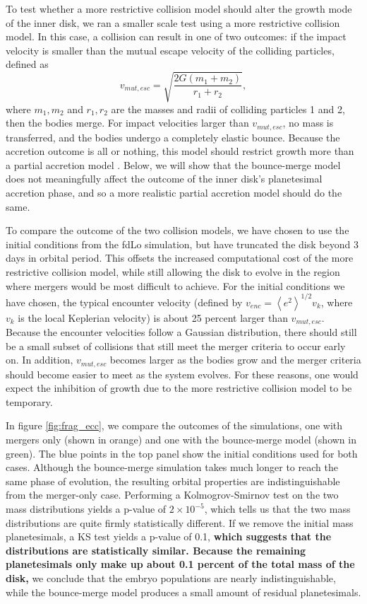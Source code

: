 \documentclass[twocolumn,linenumbers]{aastex63}
\begin{document}
To test whether a more restrictive collision model should alter the growth mode of the inner disk, we ran a smaller scale test 
using a more restrictive collision model. In this case, a collision can result in one of two outcomes: if the impact velocity is 
smaller than the mutual escape velocity of the colliding particles, defined as
\begin{equation}\label{eq:v_mut}
	v_{mut, esc} = \sqrt{\frac{2 G (m_{1} + m_{2})}{r_{1} + r_{2}}},
\end{equation}
where $m_{1}, m_{2}$ and $r_{1}, r_{2}$ are the masses and radii of
colliding particles 1 and 2, then the bodies merge. For
impact velocities larger than $v_{mut, esc}$, no mass is transferred, and the bodies undergo a completely elastic bounce. 
Because the accretion outcome is all or nothing, this model should restrict growth more than a partial accretion model 
\citep{leinhardt12}. Below, we will show that the bounce-merge model does not meaningfully affect the outcome of the inner 
disk's planetesimal accretion phase, and so a more realistic partial accretion model should do the same.

To compare the outcome of the two collision models, we have chosen to use the initial conditions from the fdLo simulation, but 
have truncated the disk beyond 3 days in orbital period. This offsets the increased computational cost of the more restrictive collision model, while still allowing the disk to evolve in the region where mergers would be most difficult to achieve.
For the initial conditions we have chosen, the typical encounter velocity (defined by $v_{enc} = \left< e^{2} \right>^{1/2} v_{k}$, 
where $v_{k}$ is the local Keplerian velocity) is about 25 percent larger than $v_{mut, esc}$. Because the encounter velocities 
follow a Gaussian distribution, there should still be a small subset of collisions that still meet the merger criteria to occur early on. 
In addition, $v_{mut, esc}$ becomes larger as the bodies grow and the merger criteria should become easier to meet as the 
system evolves. For these reasons, one would expect the inhibition of growth due to the more restrictive collision model to be 
temporary.

In figure \ref{fig:frag_ecc}, we compare the outcomes of the simulations, one with mergers only (shown in orange) and one with 
the bounce-merge model (shown in green). The blue points in the top panel show the initial conditions used for both cases. 
Although the bounce-merge simulation takes much longer to reach the same phase of evolution, the resulting orbital properties
are indistinguishable from the merger-only case. Performing a Kolmogrov-Smirnov test on the two mass distributions yields
a p-value of $2 \times 10^{-5}$, which tells us that the two mass distributions are quite firmly statistically different. If we remove
the initial mass planetesimals, a KS test yields a p-value of 0.1, \textbf{which suggests that the distributions are statistically similar. Because the remaining planetesimals only make up about 0.1 percent of the total mass of the disk,} we conclude that the embryo populations are nearly indistinguishable, while the bounce-merge model produces a small amount of residual planetesimals.
\end{document}
